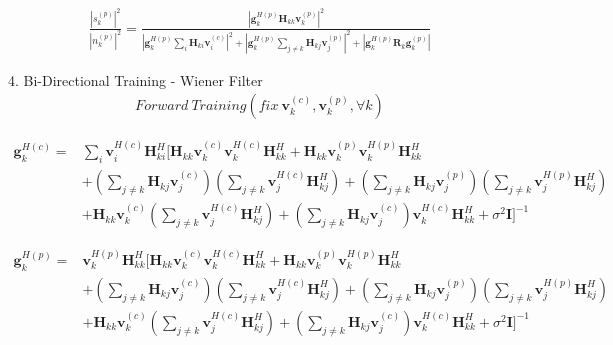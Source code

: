 \documentclass[11pt, oneside]{article}   	%
\begin{document}
\begin{align*}
\frac	{	|s^{(p)}_{k}|^2	}{	|n^{(p)}_{k}|^2	} = 
\frac {|\textbf{g}^{H(p)}_{k}
		\textbf{H}_{kk} 
		\textbf{v}^{(p)}_{k}|^2	
	} 
	{	|\textbf{g}^{H(p)}_{k}
		\displaystyle\sum_{i}
		\textbf{H}_{ki} 
		\textbf{v}^{(c)}_{i}|^2
		+|\textbf{g}^{H(p)}_{k}
		\displaystyle\sum_{j \neq k}
		\textbf{H}_{kj} 
		\textbf{v}^{(p)}_{j}|^2
		+|\textbf{g}^{H(p)}_{k}
		\textbf{R}_{k}
		\textbf{g}^{(p)}_{k}|
	}
\end{align*}

4. Bi-Directional Training - Wiener Filter 
\begin{align*}
Forward\ Training (fix\  \textbf{v}^{(c)}_{k}, \textbf{v}^{(p)}_{k}, \forall k)
\end{align*}

\begin{align*}
\textbf{g}^{H(c)}_{k} = &\displaystyle\sum_{i}	\textbf{v}^{H(c)}_{i}	\textbf{H}^{H}_{ki} 
[
\textbf{H}_{kk}	\textbf{v}^{(c)}_{k}	\textbf{v}^{H(c)}_{k}	\textbf{H}^{H}_{kk}
+\textbf{H}_{kk}	\textbf{v}^{(p)}_{k}	\textbf{v}^{H(p)}_{k}	\textbf{H}^{H}_{kk}	\\
&+(\displaystyle\sum_{j \neq k}\textbf{H}_{kj}\textbf{v}^{(c)}_{j})
(\displaystyle\sum_{j \neq k}\textbf{v}^{H(c)}_{j}\textbf{H}^{H}_{kj})
+(\displaystyle\sum_{j \neq k}\textbf{H}_{kj}\textbf{v}^{(p)}_{j})
(\displaystyle\sum_{j \neq k}\textbf{v}^{H(p)}_{j}\textbf{H}^{H}_{kj})	\\
&+\textbf{H}_{kk}	\textbf{v}^{(c)}_{k}
(\displaystyle\sum_{j \neq k}\textbf{v}^{H(c)}_{j}\textbf{H}^{H}_{kj})
+(\displaystyle\sum_{j \neq k}\textbf{H}_{kj}\textbf{v}^{(c)}_{j})
\textbf{v}^{H(c)}_{k}	\textbf{H}^{H}_{kk}
+\sigma^2	\textbf{I}
]^{-1}	
\end{align*}

\begin{align*}
\textbf{g}^{H(p)}_{k} = &	\textbf{v}^{H(p)}_{k}	\textbf{H}^{H}_{kk} 
[
\textbf{H}_{kk}	\textbf{v}^{(c)}_{k}	\textbf{v}^{H(c)}_{k}	\textbf{H}^{H}_{kk}
+\textbf{H}_{kk}	\textbf{v}^{(p)}_{k}	\textbf{v}^{H(p)}_{k}	\textbf{H}^{H}_{kk}	\\
&+(\displaystyle\sum_{j \neq k}\textbf{H}_{kj}\textbf{v}^{(c)}_{j})
(\displaystyle\sum_{j \neq k}\textbf{v}^{H(c)}_{j}\textbf{H}^{H}_{kj})
+(\displaystyle\sum_{j \neq k}\textbf{H}_{kj}\textbf{v}^{(p)}_{j})
(\displaystyle\sum_{j \neq k}\textbf{v}^{H(p)}_{j}\textbf{H}^{H}_{kj})	\\
&+\textbf{H}_{kk}	\textbf{v}^{(c)}_{k}
(\displaystyle\sum_{j \neq k}\textbf{v}^{H(c)}_{j}\textbf{H}^{H}_{kj})
+(\displaystyle\sum_{j \neq k}\textbf{H}_{kj}\textbf{v}^{(c)}_{j})
\textbf{v}^{H(c)}_{k}	\textbf{H}^{H}_{kk}
+\sigma^2	\textbf{I}
]^{-1}	
\end{align*}
\end{document}

